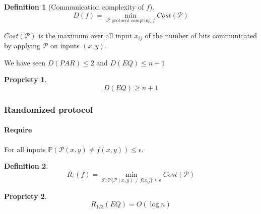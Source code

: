 \documentclass{article}
\newtheorem{prop}{Propriety}
\newtheorem{defi}{Definition}
\begin{document}
\begin{defi}[Communication complexity of $f$]
\[D(f)=\min_{\mathcal{P}\text{ protocol compting } f} Cost( \mathcal{P}) \]
\end{defi}

$Cost(\mathcal{P})$ is the maximum over all input $x_{ij}$ of the number of bits communicated by applying $\mathcal{P}$ on inputs $(x,y)$.

We have seen $D(PAR)\leq 2$ and $D(EQ) \leq n+1$

\begin{prop}
\[D(EQ)\geq n+1\]
\end{prop}

\subsubsection*{Randomized protocol}
\paragraph{Require}
For all inputs $\mathbb{P}(\mathcal{P}(x,y)\neq f(x,y))\leq \epsilon$.

\begin{defi}
\[R_\epsilon (f) = \min_{\mathcal{P}:\mathbb{P}\{ \mathcal{P}(x,y)\neq f(x_{ij}\} \leq \epsilon } Cost(\mathcal{P})\]
\end{defi}

\begin{prop}
\[R_{1/3}(EQ)=O(\log n)\]
\end{prop}
\end{document}
